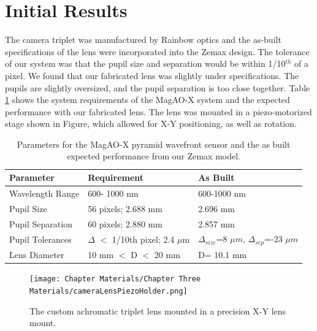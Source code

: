 \section{Initial Results}
	
The camera triplet was manufactured by Rainbow optics and the as-built specifications of the lens were incorporated into the Zemax design. The tolerance of our system was that the pupil size and separation would be within 1/10$^{th}$ of a pixel. We found that our fabricated lens was slightly under specifications. The pupils are slightly oversized, and the pupil separation is too close together. Table \ref{tab:asbuilt} shows the system requirements of the MagAO-X system and the expected performance with our fabricated lens. The lens was mounted in a piezo-motorized stage shown in Figure, which allowed for X-Y positioning, as well as rotation. 
	
	
\begin{table}
	\begin{center}
		\begin{tabular}{ | l| l |  l |}
			\hline
			\textbf{Parameter}& \textbf{Requirement} & \textbf{As Built}\\ \hline
			Wavelength Range &600- 1000 nm& 600-1000 nm\\ \hline
			Pupil Size & 56 pixels; 2.688 mm& 2.696 mm\\ \hline
			Pupil Separation & 60 pixels; 2.880 mm& 2.857 mm \\ \hline
			Pupil Tolerances & $\Delta$ $<$ 1/10th pixel; 2.4 $\mu$m& $\Delta_{size}$=8 $\mu m$,  $\Delta_{sep}$=-23 $\mu m$ \\ \hline
			Lens Diameter & 10 mm $<$ D  $<$ 20 mm & D= 10.1 mm\\ \hline
				
		\end{tabular}
	\end{center}
	\caption{Parameters for the MagAO-X pyramid wavefront sensor and the as built expected performance from our Zemax model.}
	\label{tab:asbuilt}
\end{table}



\begin{figure}
    \centering
    \texttt{[image: Chapter Materials/Chapter Three Materials/cameraLensPiezoHolder.png]}
    \caption{The custom achromatic triplet lens mounted in a precision X-Y lens mount.}
    \label{fig:mountedtriplet}
\end{figure}
	
